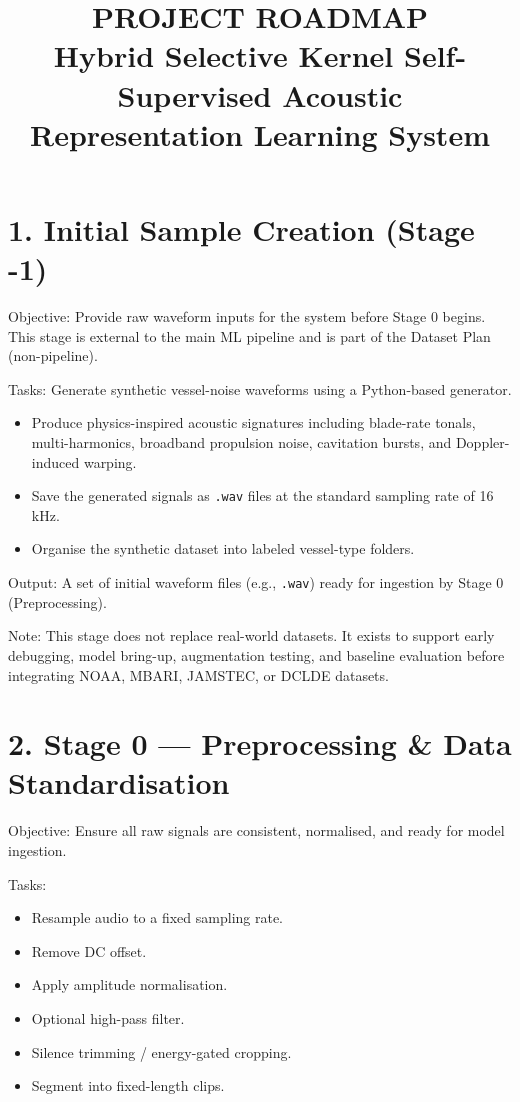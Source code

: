 \documentclass[11pt,a4paper]{article}
\title{PROJECT ROADMAP\\Hybrid Selective Kernel Self-Supervised Acoustic Representation Learning System}
\author{}
\date{}
\begin{document}
\maketitle

\section*{1. Initial Sample Creation (Stage -1)}

Objective: Provide raw waveform inputs for the system before Stage 0 begins.
This stage is external to the main ML pipeline and is part of the Dataset Plan (non-pipeline).

Tasks: Generate synthetic vessel-noise waveforms using a Python-based generator.
\begin{itemize}
\item Produce physics-inspired acoustic signatures including blade-rate tonals, multi-harmonics, broadband propulsion noise, cavitation bursts, and Doppler-induced warping.
\item Save the generated signals as \texttt{.wav} files at the standard sampling rate of 16 kHz.
\item Organise the synthetic dataset into labeled vessel-type folders.
\end{itemize}

Output: A set of initial waveform files (e.g., \texttt{.wav}) ready for ingestion by Stage 0 (Preprocessing).

Note: This stage does not replace real-world datasets. It exists to support early debugging, model bring-up, augmentation testing, and baseline evaluation before integrating NOAA, MBARI, JAMSTEC, or DCLDE datasets.

\section*{2. Stage 0 — Preprocessing \& Data Standardisation}

Objective: Ensure all raw signals are consistent, normalised, and ready for model ingestion.

Tasks:
\begin{itemize}
\item Resample audio to a fixed sampling rate.
\item Remove DC offset.
\item Apply amplitude normalisation.
\item Optional high-pass filter.
\item Silence trimming / energy-gated cropping.
\item Segment into fixed-length clips.
\end{itemize}
\end{document}
